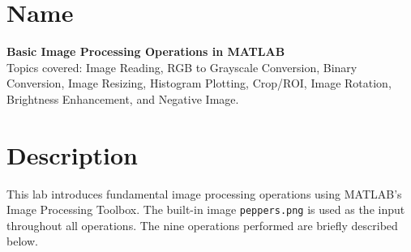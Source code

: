 \documentclass[12pt,a4paper]{article}
\begin{document}

\section{Name}

\textbf{Basic Image Processing Operations in MATLAB}\\[0.3em]
Topics covered: Image Reading, RGB to Grayscale Conversion, Binary Conversion,
Image Resizing, Histogram Plotting, Crop/ROI, Image Rotation,
Brightness Enhancement, and Negative Image.


\section{Description}

This lab introduces fundamental image processing operations using MATLAB's
Image Processing Toolbox. The built-in image \texttt{peppers.png} is used as
the input throughout all operations. The nine operations performed are briefly
described below.
\end{document}
